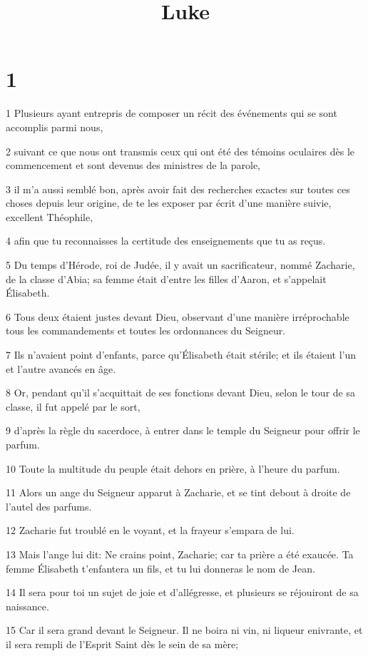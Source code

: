 

\title{Luke}


\chapter{1}

\par 1 Plusieurs ayant entrepris de composer un récit des événements qui se sont accomplis parmi nous,
\par 2 suivant ce que nous ont transmis ceux qui ont été des témoins oculaires dès le commencement et sont devenus des ministres de la parole,
\par 3 il m'a aussi semblé bon, après avoir fait des recherches exactes sur toutes ces choses depuis leur origine, de te les exposer par écrit d'une manière suivie, excellent Théophile,
\par 4 afin que tu reconnaisses la certitude des enseignements que tu as reçus.
\par 5 Du temps d'Hérode, roi de Judée, il y avait un sacrificateur, nommé Zacharie, de la classe d'Abia; sa femme était d'entre les filles d'Aaron, et s'appelait Élisabeth.
\par 6 Tous deux étaient justes devant Dieu, observant d'une manière irréprochable tous les commandements et toutes les ordonnances du Seigneur.
\par 7 Ils n'avaient point d'enfants, parce qu'Élisabeth était stérile; et ils étaient l'un et l'autre avancés en âge.
\par 8 Or, pendant qu'il s'acquittait de ses fonctions devant Dieu, selon le tour de sa classe, il fut appelé par le sort,
\par 9 d'après la règle du sacerdoce, à entrer dans le temple du Seigneur pour offrir le parfum.
\par 10 Toute la multitude du peuple était dehors en prière, à l'heure du parfum.
\par 11 Alors un ange du Seigneur apparut à Zacharie, et se tint debout à droite de l'autel des parfums.
\par 12 Zacharie fut troublé en le voyant, et la frayeur s'empara de lui.
\par 13 Mais l'ange lui dit: Ne crains point, Zacharie; car ta prière a été exaucée. Ta femme Élisabeth t'enfantera un fils, et tu lui donneras le nom de Jean.
\par 14 Il sera pour toi un sujet de joie et d'allégresse, et plusieurs se réjouiront de sa naissance.
\par 15 Car il sera grand devant le Seigneur. Il ne boira ni vin, ni liqueur enivrante, et il sera rempli de l'Esprit Saint dès le sein de sa mère;
